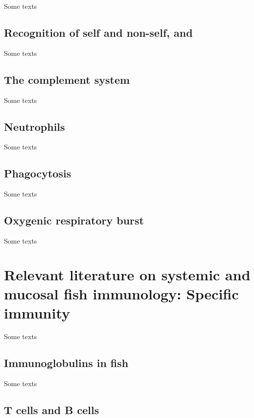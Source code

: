 Some texts

\subsection{Recognition of self and non-self,  and }
\label{ssec:self-nonself-pamp-prr}

Some texts

\subsection{The complement system}
\label{ssec:complement}

Some texts

\subsection{Neutrophils}
\label{ssec:neutrophil}

Some texts

\subsection{Phagocytosis}
\label{ssec:phagocytosis}

Some texts

\subsection{Oxygenic respiratory burst}
\label{ssec:oxygenic-respiratory-burst}

Some texts

\newpage

\section{Relevant literature on systemic and mucosal fish immunology: Specific immunity}
\label{sec:systemic-mucosal-immuno-specific}

Some texts

\subsection{Immunoglobulins in fish}
\label{ssec:immunoglobulins-fish}

Some texts

\subsection{T cells and B cells}
\label{ssec:tcell-bcell}

